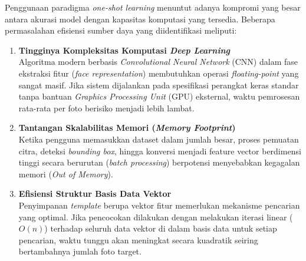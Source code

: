 Penggunaan paradigma \textit{one-shot learning} menuntut adanya kompromi yang besar antara akurasi model dengan kapasitas komputasi yang tersedia. Beberapa permasalahan efisiensi sumber daya yang diidentifikasi meliputi:

\begin{enumerate}
  \item \textbf{Tingginya Kompleksitas Komputasi \textit{Deep Learning}} \\
  Algoritma modern berbasis \textit{Convolutional Neural Network} (CNN) dalam fase ekstraksi fitur (\textit{face representation}) membutuhkan operasi \textit{floating-point} yang sangat masif. Jika sistem dijalankan pada spesifikasi perangkat keras standar tanpa bantuan \textit{Graphics Processing Unit} (GPU) eksternal, waktu pemrosesan rata-rata per foto berisiko menjadi lebih lambat.

  \item \textbf{Tantangan Skalabilitas Memori (\textit{Memory Footprint})} \\
  Ketika pengguna memasukkan dataset dalam jumlah besar, proses pemuatan citra, deteksi \textit{bounding box}, hingga konversi menjadi feature vector berdimensi tinggi secara berurutan (\textit{batch processing}) berpotensi menyebabkan kegagalan memori (\textit{Out of Memory}).

  \item \textbf{Efisiensi Struktur Basis Data Vektor} \\
  Penyimpanan \textit{template} berupa vektor fitur memerlukan mekanisme pencarian yang optimal. Jika pencocokan dilakukan dengan melakukan iterasi linear ($O(n)$) terhadap seluruh data vektor di dalam basis data untuk setiap pencarian, waktu tunggu akan meningkat secara kuadratik seiring bertambahnya jumlah foto target.

\end{enumerate}